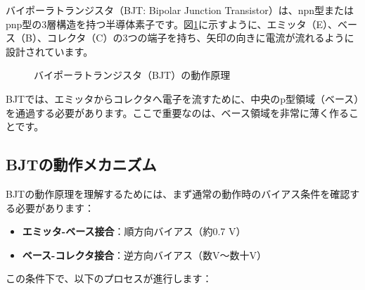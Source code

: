バイポーラトランジスタ（BJT: Bipolar Junction Transistor）は、npn型またはpnp型の3層構造を持つ半導体素子です。図\ref{fig:bjt_structure}に示すように、エミッタ（E）、ベース（B）、コレクタ（C）の3つの端子を持ち、矢印の向きに電流が流れるように設計されています。

\begin{figure}[H]
\centering
{}
\caption{バイポーラトランジスタ（BJT）の動作原理}
\label{fig:bjt_structure}
\end{figure}

BJTでは、エミッタからコレクタへ電子を流すために、中央のp型領域（ベース）を通過する必要があります。ここで重要なのは、ベース領域を非常に薄く作ることです。

\subsection{BJTの動作メカニズム}

BJTの動作原理を理解するためには、まず通常の動作時のバイアス条件を確認する必要があります：

\begin{itemize}
\item \textbf{エミッタ-ベース接合}：順方向バイアス（約0.7 V）
\item \textbf{ベース-コレクタ接合}：逆方向バイアス（数V〜数十V）
\end{itemize}

この条件下で、以下のプロセスが進行します：

